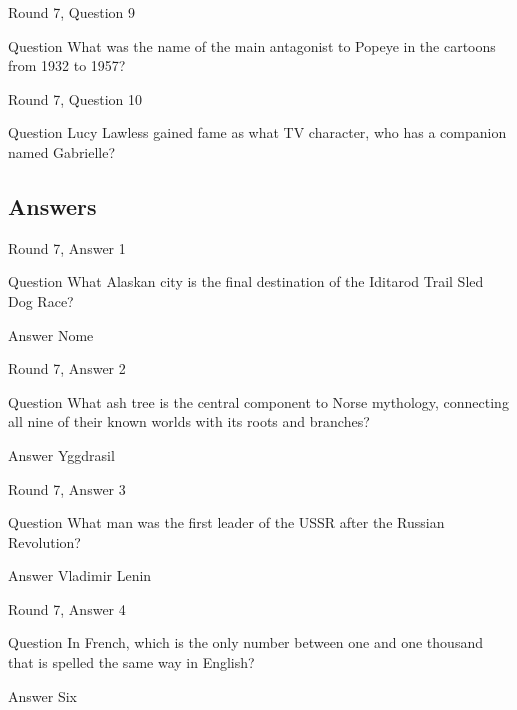 \documentclass[11pt]{beamer}
\begin{document}
\begin{frame}{Round 7, Question 9}
\begin{block}{Question}
What was the name of the main antagonist to Popeye in the cartoons from 1932 to 1957\@?
\end{block}
\end{frame}
    

\begin{frame}{Round 7, Question 10}
\begin{block}{Question}
Lucy Lawless gained fame as what TV character, who has a companion named Gabrielle\@?
\end{block}
\end{frame}
    
\subsection{Answers}

\begin{frame}{Round 7, Answer 1}
\begin{block}{Question}
What Alaskan city is the final destination of the Iditarod Trail Sled Dog Race\@?
\end{block}
\pause{}
\begin{block}{Answer}
Nome
\end{block}
\end{frame}
    

\begin{frame}{Round 7, Answer 2}
\begin{block}{Question}
What ash tree is the central component to Norse mythology, connecting all nine of their known worlds with its roots and branches\@?
\end{block}
\pause{}
\begin{block}{Answer}
Yggdrasil
\end{block}
\end{frame}
    

\begin{frame}{Round 7, Answer 3}
\begin{block}{Question}
What man was the first leader of the USSR after the Russian Revolution\@?
\end{block}
\pause{}
\begin{block}{Answer}
Vladimir Lenin
\end{block}
\end{frame}
    

\begin{frame}{Round 7, Answer 4}
\begin{block}{Question}
In French, which is the only number between one and one thousand that is spelled the same way in English\@?
\end{block}
\pause{}
\begin{block}{Answer}
Six
\end{block}
\end{frame}
    
\end{document}
